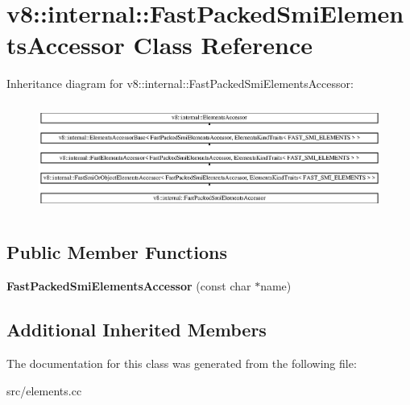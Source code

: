 \hypertarget{classv8_1_1internal_1_1_fast_packed_smi_elements_accessor}{}\section{v8\+:\+:internal\+:\+:Fast\+Packed\+Smi\+Elements\+Accessor Class Reference}
\label{classv8_1_1internal_1_1_fast_packed_smi_elements_accessor}
Inheritance diagram for v8\+:\+:internal\+:\+:Fast\+Packed\+Smi\+Elements\+Accessor\+:\begin{figure}[H]
\begin{center}
\leavevmode
\includegraphics[height=3.612903cm]{classv8_1_1internal_1_1_fast_packed_smi_elements_accessor}
\end{center}
\end{figure}
\subsection*{Public Member Functions}
\begin{DoxyCompactItemize}
\item 
\hypertarget{classv8_1_1internal_1_1_fast_packed_smi_elements_accessor_aeb9432cea46c4c66108c31bf3de812fd}{}{\bfseries Fast\+Packed\+Smi\+Elements\+Accessor} (const char $\ast$name)\label{classv8_1_1internal_1_1_fast_packed_smi_elements_accessor_aeb9432cea46c4c66108c31bf3de812fd}

\end{DoxyCompactItemize}
\subsection*{Additional Inherited Members}


The documentation for this class was generated from the following file\+:\begin{DoxyCompactItemize}
\item 
src/elements.\+cc\end{DoxyCompactItemize}
